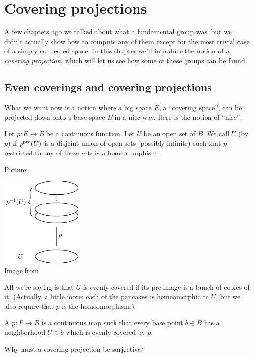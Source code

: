 \chapter{Covering projections}
A few chapters ago we talked about what a fundamental group was,
but we didn't actually show how to compute any of them
except for the most trivial case of a simply connected space.
In this chapter we'll introduce the notion of a \emph{covering projection},
which will let us see how some of these groups can be found.

\section{Even coverings and covering projections}
What we want now is a notion where a big space $E$, a ``covering space'',
can be projected down onto a base space $B$ in a nice way.
Here is the notion of ``nice'':
\begin{definition}
	Let $p : E \to B$ be a continuous function.
	Let $U$ be an open set of $B$.
	We call $U$  (by $p$) if $p^{\text{pre}}(U)$ is a disjoint union of open sets (possibly infinite) such that $p$ restricted to any of these sets is a homeomorphism.  
\end{definition}
Picture:
\begin{center}
	\includegraphics[width=4cm]{media/even-covering.png}
	\\ \tiny Image from \cite{img:even_covering}
\end{center}
All we're saying is that $U$ is evenly covered if its pre-image
is a bunch of copies of it. (Actually, a little more: each of the pancakes is homeomorphic to $U$, but we also require that $p$ is the homeomorphism.)

\begin{definition}
	A  $p : E \to B$
	is a continuous map such that every base point $b \in B$
	has a neighborhood $U \ni b$ which is evenly covered by $p$.
\end{definition}
\begin{ques}
	Why must a covering projection be surjective?
\end{ques}

